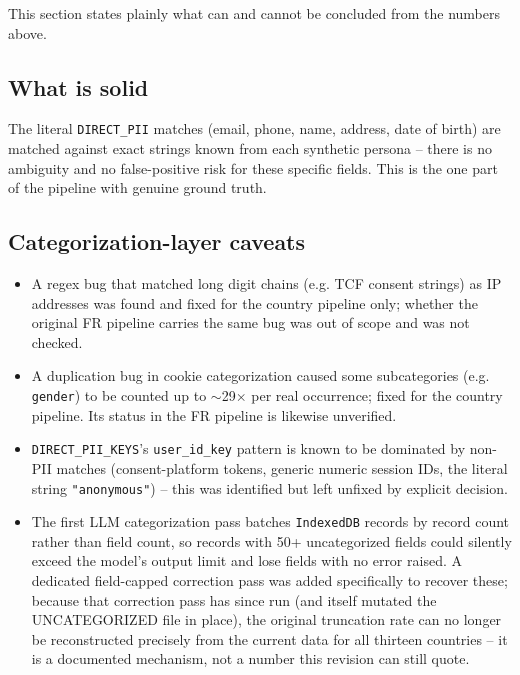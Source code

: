 \documentclass[11pt,a4paper]{article}
\newcommand{\code}[1]{\texttt{#1}}
\begin{document}
This section states plainly what can and cannot be concluded from the
numbers above.

\subsection{What is solid}

The literal \code{DIRECT\_PII} matches (email, phone, name, address, date of
birth) are matched against exact strings known from each synthetic persona --
there is no ambiguity and no false-positive risk for these specific fields.
This is the one part of the pipeline with genuine ground truth.

\subsection{Categorization-layer caveats}

\begin{itemize}[leftmargin=1.3cm]
  \item A regex bug that matched long digit chains (e.g. TCF consent
    strings) as IP addresses was found and fixed for the country pipeline
    only; whether the original FR pipeline carries the same bug was out of
    scope and was not checked.
  \item A duplication bug in cookie categorization caused some
    subcategories (e.g. \code{gender}) to be counted up to $\sim$29$\times$
    per real occurrence; fixed for the country pipeline. Its status in the
    FR pipeline is likewise unverified.
  \item \code{DIRECT\_PII\_KEYS}'s \code{user\_id\_key} pattern is known to
    be dominated by non-PII matches (consent-platform tokens, generic
    numeric session IDs, the literal string \code{"anonymous"}) -- this was
    identified but left unfixed by explicit decision.
  \item The first LLM categorization pass batches \code{IndexedDB} records by
    record count rather than field count, so records with 50+ uncategorized
    fields could silently exceed the model's output limit and lose fields
    with no error raised. A dedicated field-capped correction pass was added
    specifically to recover these; because that correction pass has since
    run (and itself mutated the UNCATEGORIZED file in place), the original
    truncation rate can no longer be reconstructed precisely from the current
    data for all thirteen countries -- it is a documented mechanism, not a
    number this revision can still quote.
\end{itemize}
\end{document}
